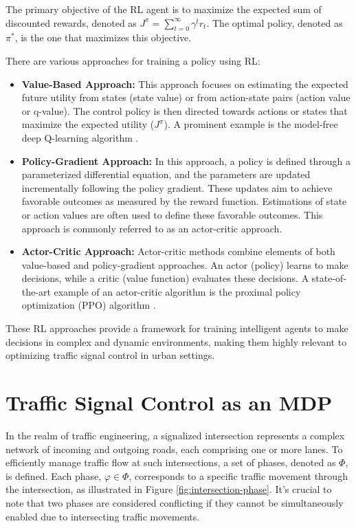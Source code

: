 The primary objective of the RL agent is to maximize the expected sum of discounted rewards, denoted as $J^\pi = \sum_{t=0}^{\infty} \gamma^t r_t$. The optimal policy, denoted as $\pi^*$, is the one that maximizes this objective.

There are various approaches for training a policy using RL:

\begin{itemize}
  \item \textbf{Value-Based Approach:} This approach focuses on estimating the expected future utility from states (state value) or from action-state pairs (action value or q-value). The control policy is then directed towards actions or states that maximize the expected utility ($J^\pi$). A prominent example is the model-free deep Q-learning algorithm \cite{mnih2015human}.
  
  \item \textbf{Policy-Gradient Approach:} In this approach, a policy is defined through a parameterized differential equation, and the parameters are updated incrementally following the policy gradient. These updates aim to achieve favorable outcomes as measured by the reward function. Estimations of state or action values are often used to define these favorable outcomes. This approach is commonly referred to as an actor-critic approach.
  
  \item \textbf{Actor-Critic Approach:} Actor-critic methods combine elements of both value-based and policy-gradient approaches. An actor (policy) learns to make decisions, while a critic (value function) evaluates these decisions. A state-of-the-art example of an actor-critic algorithm is the proximal policy optimization (PPO) algorithm \cite{schulman2017proximal}.
\end{itemize}

These RL approaches provide a framework for training intelligent agents to make decisions in complex and dynamic environments, making them highly relevant to optimizing traffic signal control in urban settings.

\section{Traffic Signal Control as an MDP}

In the realm of traffic engineering, a signalized intersection represents a complex network of incoming and outgoing roads, each comprising one or more lanes. To efficiently manage traffic flow at such intersections, a set of phases, denoted as $\Phi$, is defined. Each phase, $\varphi \in \Phi$, corresponds to a specific traffic movement through the intersection, as illustrated in Figure \ref{fig:intersection-phase}. It's crucial to note that two phases are considered conflicting if they cannot be simultaneously enabled due to intersecting traffic movements.

